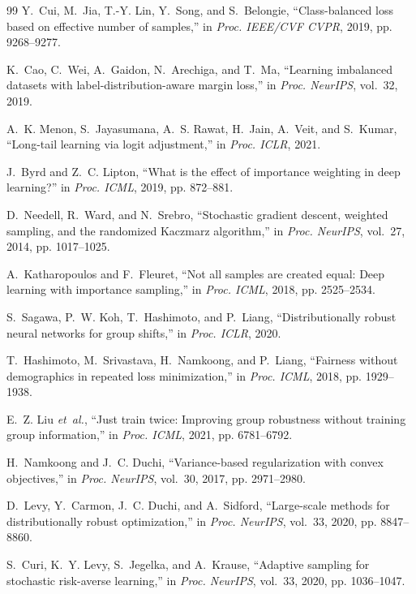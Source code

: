 \documentclass{article}
\theoremstyle{definition}
\begin{document}
\begin{thebibliography}{99}
Y.~Cui, M.~Jia, T.-Y. Lin, Y.~Song, and S.~Belongie, ``Class-balanced loss
based on effective number of samples,'' in \emph{Proc. IEEE/CVF CVPR},
2019, pp. 9268--9277.

K.~Cao, C.~Wei, A.~Gaidon, N.~Arechiga, and T.~Ma, ``Learning imbalanced
datasets with label-distribution-aware margin loss,'' in \emph{Proc.
NeurIPS}, vol.~32, 2019.

A.~K. Menon, S.~Jayasumana, A.~S. Rawat, H.~Jain, A.~Veit, and S.~Kumar,
``Long-tail learning via logit adjustment,'' in \emph{Proc. ICLR}, 2021.

J.~Byrd and Z.~C. Lipton, ``What is the effect of importance weighting in
deep learning?'' in \emph{Proc. ICML}, 2019, pp. 872--881.

D.~Needell, R.~Ward, and N.~Srebro, ``Stochastic gradient descent,
weighted sampling, and the randomized Kaczmarz algorithm,'' in \emph{Proc.
NeurIPS}, vol.~27, 2014, pp. 1017--1025.

A.~Katharopoulos and F.~Fleuret, ``Not all samples are created equal: Deep
learning with importance sampling,'' in \emph{Proc. ICML}, 2018,
pp. 2525--2534.

S.~Sagawa, P.~W. Koh, T.~Hashimoto, and P.~Liang, ``Distributionally robust
neural networks for group shifts,'' in \emph{Proc. ICLR}, 2020.

T.~Hashimoto, M.~Srivastava, H.~Namkoong, and P.~Liang, ``Fairness without
demographics in repeated loss minimization,'' in \emph{Proc. ICML}, 2018,
pp. 1929--1938.

E.~Z. Liu \emph{et~al.}, ``Just train twice: Improving group robustness
without training group information,'' in \emph{Proc. ICML}, 2021,
pp. 6781--6792.

H.~Namkoong and J.~C. Duchi, ``Variance-based regularization with convex
objectives,'' in \emph{Proc. NeurIPS}, vol.~30, 2017, pp. 2971--2980.

D.~Levy, Y.~Carmon, J.~C. Duchi, and A.~Sidford, ``Large-scale methods for
distributionally robust optimization,'' in \emph{Proc. NeurIPS}, vol.~33,
2020, pp. 8847--8860.

S.~Curi, K.~Y. Levy, S.~Jegelka, and A.~Krause, ``Adaptive sampling for
stochastic risk-averse learning,'' in \emph{Proc. NeurIPS}, vol.~33, 2020,
pp. 1036--1047.


\end{thebibliography}
\end{document}

